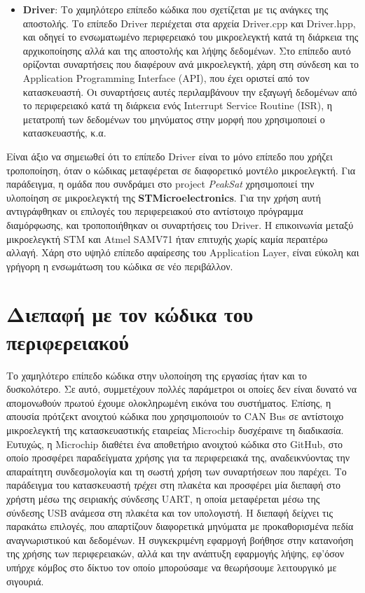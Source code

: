 \documentclass[a4paper,nobib,justified]{tufte-book}
\begin{document}
\begin{itemize}
	\item \textbf{Driver}: Το χαμηλότερο επίπεδο κώδικα που σχετίζεται με τις ανάγκες της αποστολής. Το επίπεδο Driver περιέχεται στα αρχεία Driver.cpp και Driver.hpp, και οδηγεί το ενσωματωμένο περιφερειακό του μικροελεγκτή κατά τη διάρκεια της αρχικοποίησης αλλά και της αποστολής και λήψης δεδομένων. Στο επίπεδο αυτό ορίζονται συναρτήσεις που διαφέρουν ανά μικροελεγκτή, χάρη στη σύνδεση και το Application Programming Interface (API), που έχει οριστεί από τον κατασκευαστή. Οι συναρτήσεις αυτές περιλαμβάνουν την εξαγωγή δεδομένων από το περιφερειακό κατά τη διάρκεια ενός Interrupt Service Routine (ISR), η μετατροπή των δεδομένων του μηνύματος στην μορφή που χρησιμοποιεί ο κατασκευαστής, κ.α.
\end{itemize}

Είναι άξιο να σημειωθεί ότι το επίπεδο Driver είναι το μόνο επίπεδο που χρήζει τροποποίηση, όταν ο κώδικας μεταφέρεται σε διαφορετικό μοντέλο μικροελεγκτή. Για παράδειγμα, η ομάδα που συνδράμει στο project \textit{PeakSat} χρησιμοποιεί την υλοποίηση σε μικροελεγκτή της \textbf{STMicroelectronics}. Για την χρήση αυτή αντιγράφθηκαν οι επιλογές του περιφερειακού στο αντίστοιχο πρόγραμμα διαμόρφωσης, και τροποποιήθηκαν οι συναρτήσεις του Driver. Η επικοινωνία μεταξύ μικροελεγκτή STM και Atmel SAMV71 ήταν επιτυχής χωρίς καμία περαιτέρω αλλαγή. Χάρη στο υψηλό επίπεδο αφαίρεσης του Application Layer, είναι εύκολη και γρήγορη η ενσωμάτωση του κώδικα σε νέο περιβάλλον.

\clearpage
\section{Διεπαφή με τον κώδικα του περιφερειακού}
Το χαμηλότερο επίπεδο κώδικα στην υλοποίηση της εργασίας ήταν και το δυσκολότερο. Σε αυτό, συμμετέχουν πολλές παράμετροι οι οποίες δεν είναι δυνατό να απομονωθούν πρωτού έχουμε ολοκληρωμένη εικόνα του συστήματος. Επίσης, η απουσία πρότζεκτ ανοιχτού κώδικα που χρησιμοποιούν το CAN Bus σε αντίστοιχο μικροελεγκτή της κατασκευαστικής εταιρείας Microchip δυσχέραινε τη διαδικασία. Ευτυχώς, η Microchip διαθέτει ένα αποθετήριο ανοιχτού κώδικα στο GitHub,  στο οποίο προσφέρει παραδείγματα χρήσης για τα περιφερειακά της, αναδεικνύοντας την απαραίτητη συνδεσμολογία και τη σωστή χρήση των συναρτήσεων που παρέχει. Το παράδειγμα του κατασκευαστή \textit{τρέχει} στη πλακέτα και προσφέρει μία διεπαφή στο χρήστη μέσω της σειριακής σύνδεσης UART, η οποία μεταφέρεται μέσω της σύνδεσης USB ανάμεσα στη πλακέτα και τον υπολογιστή. Η διεπαφή δείχνει τις παρακάτω επιλογές, που απαρτίζουν διαφορετικά μηνύματα με προκαθορισμένα πεδία αναγνωριστικού και δεδομένων. Η συγκεκριμένη εφαρμογή βοήθησε στην κατανοήση της χρήσης των περιφερειακών, αλλά και την ανάπτυξη εφαρμογής λήψης, εφ'όσον υπήρχε κόμβος στο δίκτυο τον οποίο μπορούσαμε να θεωρήσουμε λειτουργικό με σιγουριά.
\end{document}
